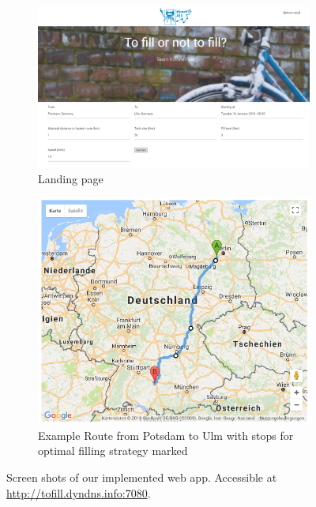 \begin{figure}
\centering
  \begin{subfigure}{0.6\textwidth}
	\begin{center}
    \includegraphics[width=1\textwidth]{img/web_app_screenshot.png}
    \caption{Landing page}
    \label{fig:landing_page}
    \end{center}
  \end{subfigure}
	\begin{subfigure}{0.3\textwidth}
	\begin{center}
    \includegraphics[width=1\textwidth]{img/web_app_route_potsdam_ulm.png}
    \caption{Example Route from Potsdam to Ulm with stops for optimal filling strategy marked}
    \label{fig:example_route}
    \end{center}
  \end{subfigure}
  \caption{Screen shots of our implemented web app. Accessible at \url{http://tofill.dyndns.info:7080}.}
\end{figure}